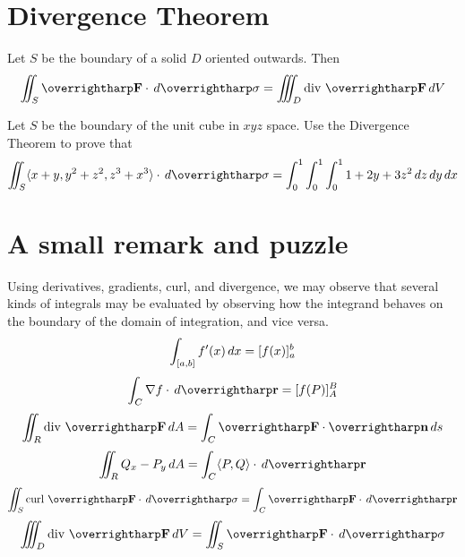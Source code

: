 \documentclass[letterpaper, twoside, 12pt]{book}
\begin{document}
          \begin{contributors}

          \end{contributors}


\section{Divergence Theorem}%

\begin{theorem}
  Let $S$ be the boundary of a solid $D$ oriented outwards.
  Then
  \[
    \iint_S \vect{F}\cdot\dvar{\vect\sigma}
      =
    \iiint_D \text{div }\vect{F}\dvar{V}
  \]
\end{theorem}

          \begin{problem}
            Let $S$ be the boundary of the unit cube in $xyz$ space.
            Use the Divergence Theorem to prove that
            \[
              \iint_S \<x+y,y^2+z^2,z^3+x^3\>\cdot\dvar{\vect\sigma}
                =
              \int_0^1\int_0^1\int_0^1 1+2y+3z^2 \dvar{z}\dvar{y}\dvar{x}
            \]
          \end{problem}

          \begin{solution}

          \end{solution}

          \begin{contributors}

          \end{contributors}

\section{A small remark and puzzle}

\begin{remark}
  Using derivatives, gradients, curl, and divergence, we may observe that
  several kinds of integrals may be evaluated by observing how the
  integrand behaves on the boundary of the domain of integration, and
  vice versa.
  \[
    \int_{[a,b]} f'(x)\,d{x} = [f(x)]_a^b
  \]
  \[
    \int_C \nabla f\cdot \dvar{\vect r} = [f(P)]_A^B
  \]
  \[
    \iint_R \text{div }\vect{F} \dvar{A}
      =
    \int_C \vect{F}\cdot\vect{n}\dvar{s}
  \]
  \[
    \iint_R Q_x-P_y \dvar{A}
      =
    \int_C \<P,Q\>\cdot\dvar{\vect r}
  \]
  \[
    \iint_S \text{curl }\vect{F}\cdot\dvar{\vect\sigma}
      =
    \int_C \vect{F}\cdot\dvar{\vect{r}}
  \]
  \[
    \iiint_D \text{div }\vect{F}\dvar{V}
      =
    \iint_S \vect{F}\cdot\dvar{\vect\sigma}
  \]
\end{remark}
\end{document}
